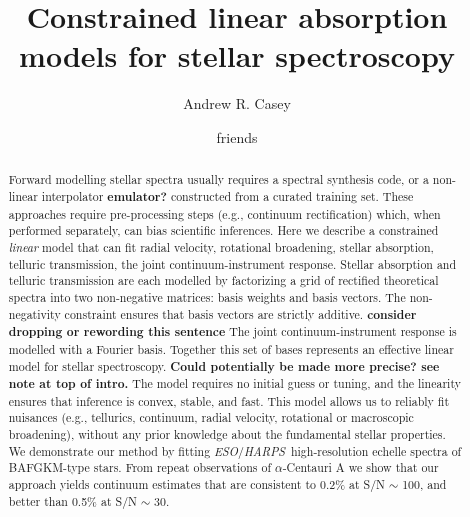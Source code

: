 \documentclass[modern]{aastex631}
\newcommand{\chosentitle}{Constrained linear absorption models for stellar spectroscopy}
\newcommand{\project}[1]{\textit{#1}}
\newcommand{\eso}{\project{ESO}}
\newcommand{\harps}{\project{HARPS}}
\newcommand{\ajw}[1]{\textbf{#1}}
\begin{document}
\title{\chosentitle}

\author[0000-0003-0174-0564]{Andrew R. Casey}

\author{friends}


\begin{abstract}\noindent
Forward modelling stellar spectra usually requires a spectral synthesis code, or a non-linear interpolator \ajw{emulator?} constructed from a curated training set.
These approaches require pre-processing steps (e.g., continuum rectification) which, when performed separately, can bias scientific inferences.
Here we describe a constrained \emph{linear} model that can fit radial velocity, rotational broadening, stellar absorption, telluric transmission, the joint continuum-instrument response.
Stellar absorption and telluric transmission are each modelled by factorizing a grid of rectified theoretical spectra into two non-negative matrices: basis weights and basis vectors.
The non-negativity constraint ensures that basis vectors are strictly additive. \ajw{consider dropping or rewording this sentence}
The joint continuum-instrument response is modelled with a Fourier basis.
Together this set of bases represents an effective linear model for stellar spectroscopy. \ajw{Could potentially be made more precise? see note at top of intro.}
The model requires no initial guess or tuning, and the linearity ensures that inference is convex, stable, and fast.
This model allows us to reliably fit nuisances (e.g., tellurics, continuum, radial velocity, rotational or macroscopic broadening), without any prior knowledge about the fundamental stellar properties.
We demonstrate our method by fitting \eso/\harps\ high-resolution echelle spectra of BAFGKM-type stars.
From repeat observations of $\alpha$-Centauri A we show that our approach yields continuum estimates that are consistent to 0.2\% at S/N $\sim$ 100, and better than 0.5\% at S/N $\sim$ 30.
\end{abstract}
\end{document}
